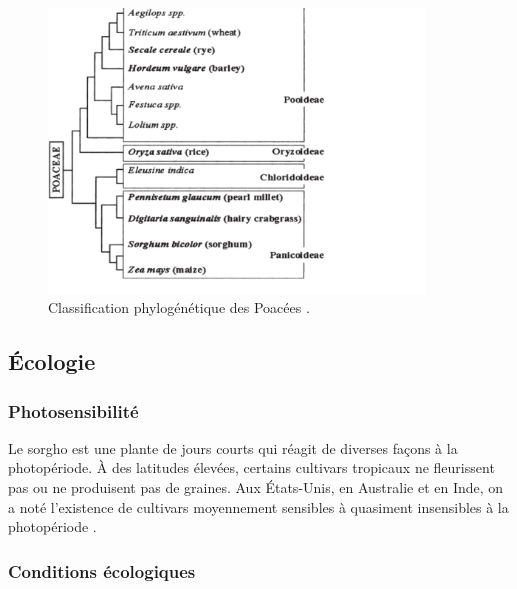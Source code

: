 \documentclass[a4paper,11pt]{article}
\begin{document}
\begin{figure}%
  \begin{center}
    \includegraphics[width=10cm]{images/PoaceaePhylogeny}
  \end{center}
  \caption{Classification phylogénétique des Poacées \protect\cite{Paquet_2005}.}
  \label{fig:phylogenie_poacees}
\end{figure}


\subsection{Écologie}

\subsubsection{Photosensibilité}

Le sorgho est une plante de jours courts qui réagit de diverses façons
à la photopériode. À des latitudes élevées, certains cultivars
tropicaux ne fleurissent pas ou ne produisent pas de graines. Aux
États-Unis, en Australie et en Inde, on a noté l'existence de
cultivars moyennement sensibles à quasiment insensibles à la
photopériode \cite{BARRO_KONDOMBO_2010}.

\subsubsection{Conditions écologiques}
\end{document}
